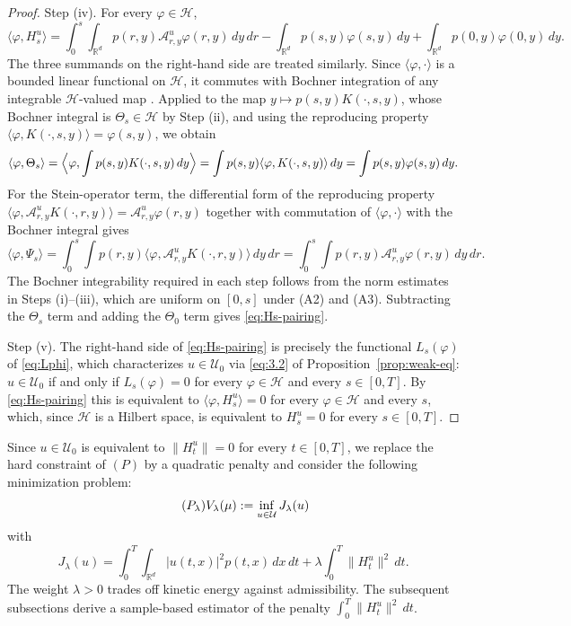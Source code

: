 \documentclass[11pt,leqno]{article}
\theoremstyle{plain}
\theoremstyle{remark}
\theoremstyle{definition}
\numberwithin{equation}{section}
\numberwithin{figure}{section}
\numberwithin{table}{section}
\begin{document}
\begin{proof}
Step (iv). For every $\varphi\in\mathcal{H}$,
\begin{equation}\label{eq:Hs-pairing}
 \langle\varphi,H_s^u\rangle
 = \int_0^s\!\!\int_{\mathbb{R}^d}p(r,y)\mathcal{A}^u_{r,y}\varphi(r,y)\,dy\,dr
 - \int_{\mathbb{R}^d}p(s,y)\varphi(s,y)\,dy
 + \int_{\mathbb{R}^d}p(0,y)\varphi(0,y)\,dy.
\end{equation}
The three summands on the right-hand side are treated similarly.
Since $\langle\varphi,\cdot\rangle$ is a bounded linear functional on
$\mathcal{H}$, it commutes with Bochner integration of any integrable
$\mathcal{H}$-valued map
\cite[Theorem~3.7]{Hytonen2016}.
Applied to the map $y\mapsto p(s,y)K(\cdot,s,y)$, whose Bochner
integral is $\Theta_s\in\mathcal{H}$ by Step (ii), and using the
reproducing property
$\langle\varphi,K(\cdot,s,y)\rangle=\varphi(s,y)$, we obtain
\[
 \langle\varphi,\Theta_s\rangle
 = \Bigl\langle\varphi,\int p(s,y)K(\cdot,s,y)\,dy\Bigr\rangle
 = \int p(s,y)\langle\varphi,K(\cdot,s,y)\rangle\,dy
 = \int p(s,y)\varphi(s,y)\,dy.
\]
For the Stein-operator term, the differential form of the reproducing
property \cite[Theorem~10.45]{Wendland2005}
$\langle\varphi,\mathcal{A}^u_{r,y}K(\cdot,r,y)\rangle=\mathcal{A}^u_{r,y}\varphi(r,y)$
together with commutation of $\langle\varphi,\cdot\rangle$ with the
Bochner integral gives
\[
 \langle\varphi,\Psi_s\rangle
 = \int_0^s\!\!\int p(r,y)\langle\varphi,\mathcal{A}^u_{r,y}K(\cdot,r,y)\rangle\,dy\,dr
 = \int_0^s\!\!\int p(r,y)\mathcal{A}^u_{r,y}\varphi(r,y)\,dy\,dr.
\]
The Bochner integrability required in each step follows from the norm
estimates in Steps (i)--(iii), which are uniform on $[0,s]$ under
(A2) and (A3).  Subtracting the $\Theta_s$ term and adding the
$\Theta_0$ term gives \eqref{eq:Hs-pairing}.

Step (v). The right-hand side of \eqref{eq:Hs-pairing} is
precisely the functional $L_s(\varphi)$ of \eqref{eq:Lphi}, which
characterizes $u\in\mathcal{U}_0$ via \eqref{eq:3.2} of
Proposition~\ref{prop:weak-eq}: $u\in\mathcal{U}_0$ if and only if
$L_s(\varphi)=0$ for every $\varphi\in\mathcal{H}$ and every
$s\in[0,T]$.  By \eqref{eq:Hs-pairing} this is equivalent to
$\langle\varphi,H_s^u\rangle=0$ for every $\varphi\in\mathcal{H}$ and
every $s$, which, since $\mathcal{H}$ is a Hilbert space, is
equivalent to $H_s^u=0$ for every $s\in[0,T]$.
\end{proof}


Since $u\in\mathcal{U}_0$ is equivalent to $\|H_t^u\|=0$ for every
$t\in[0,T]$, we replace the hard constraint of $(P)$ by a quadratic
penalty and consider the following minimization problem: 
\begin{equation}
\tag{$P_{\lambda}$}\label{eq:Plambda}
 V_{\lambda}(\mu):= \inf_{u\in\mathcal{U}} J_{\lambda}(u) 
\end{equation}
with 
\[
 J_{\lambda}(u)=\int_0^T\int_{\mathbb{R}^d}|u(t,x)|^2p(t,x)\,dx\,dt + \lambda\int_0^T\|H_t^u\|^2\,dt.
\]
The weight $\lambda>0$ trades off kinetic energy against admissibility.
The subsequent subsections derive a sample-based estimator of the
penalty $\int_0^T\|H_t^u\|^2\,dt$.
\end{document}
